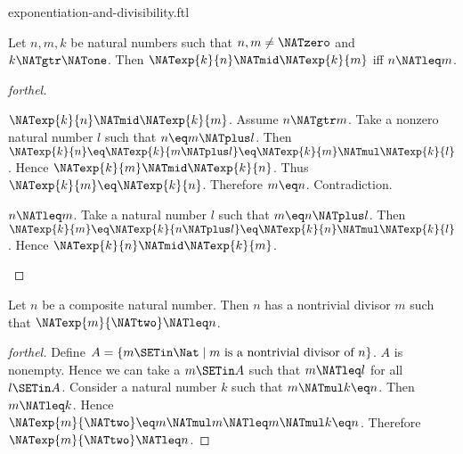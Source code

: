 \documentclass{naproche-library}
\begin{document}
\begin{smodule}[title=Exponentiation and Divisibility]{exponentiation-and-divisibility.ftl}

\begin{proposition}[forthel,id=ARITHMETIC_13_8426075493236736]
  Let $n, m, k$ be natural numbers such that $n, m \neq \NATzero$ and $k \NATgtr \NATone$.
  Then $\NATexp{k}{n} \NATmid \NATexp{k}{m}$ iff $n \NATleq m$.
\end{proposition}
\begin{proof}[forthel]
  \begin{case}{$\NATexp{k}{n} \NATmid \NATexp{k}{m}$.}
    Assume $n \NATgtr m$.
    Take a nonzero natural number $l$ such that $n \eq m \NATplus l$.
    Then $\NATexp{k}{n}
      \eq \NATexp{k}{m \NATplus l}
      \eq \NATexp{k}{m} \NATmul \NATexp{k}{l}$.
    Hence $\NATexp{k}{m} \NATmid \NATexp{k}{n}$.
    Thus $\NATexp{k}{m} \eq \NATexp{k}{n}$.
    Therefore $m \eq n$.
    Contradiction.
  \end{case}

  \begin{case}{$n \NATleq m$.}
    Take a natural number $l$ such that $m \eq n \NATplus l$.
    Then $\NATexp{k}{m}
      \eq \NATexp{k}{n \NATplus l}
      \eq \NATexp{k}{n} \NATmul \NATexp{k}{l}$.
    Hence $\NATexp{k}{n} \NATmid \NATexp{k}{m}$.
  \end{case}
\end{proof}

\begin{proposition}[forthel,id=ARITHMETIC_13_797196163219456]
  Let $n$ be a composite natural number.
  Then $n$ has a nontrivial divisor $m$ such that $\NATexp{m}{\NATtwo} \NATleq n$.
\end{proposition}
\begin{proof}[forthel]
  Define $A = \{ m \SETin \Nat \mid m\text{ is a nontrivial divisor of }n \}$.
  $A$ is nonempty.
  Hence we can take a $m \SETin A$ such that $m \NATleq l$ for all $l \SETin A$.
  Consider a natural number $k$ such that $m \NATmul k \eq n$.
  Then $m \NATleq k$.
  Hence $\NATexp{m}{\NATtwo} \eq m \NATmul m \NATleq m \NATmul k \eq n$.
  Therefore $\NATexp{m}{\NATtwo} \NATleq n$.
\end{proof}
\end{smodule}
\end{document}
